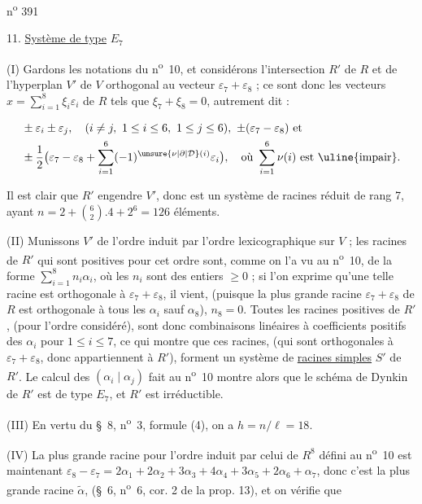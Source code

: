 \hfill n\textsuperscript{o} 391

11. \uline{Système de type} $E_7$

(I) Gardons les notations du n\textsuperscript{o}~10, et considérons l'intersection $R'$ de $R$ et de l'hyperplan $V'$ de $V$ orthogonal au vecteur $\varepsilon_7+\varepsilon_8$ ; ce sont donc les vecteurs $x=\displaystyle\sum_{i=1}^{8}\xi_i\varepsilon_i$ de $R$ tels que $\xi_7+\xi_8=0$, autrement dit :

\[
\begin{aligned}
&\pm\varepsilon_i\pm\varepsilon_j,\quad(i\neq j,\ 1\leq i\leq6,\ 1\leq j\leq6),\ \pm(\varepsilon_7-\varepsilon_8)\text{ et}\\
&\pm\frac{1}{2}\bigl(\varepsilon_7-\varepsilon_8+\sum_{i=1}^{6}(-1)^{\unsure{\nu|\partial|\mathcal D}(i)}\varepsilon_i\bigr),\quad\text{où }\sum_{i=1}^{6}\nu(i)\text{ est \uline{impair}.}
\end{aligned}
\]

Il est clair que $R'$ engendre $V'$, donc est un système de racines réduit de rang 7, ayant $n=2+\binom{6}{2}.4+2^6=126$ éléments.

(II) Munissons $V'$ de l'ordre induit par l'ordre lexicographique sur $V$ ; les racines de $R'$ qui sont positives pour cet ordre sont, comme on l'a vu au n\textsuperscript{o}~10, de la forme $\displaystyle\sum_{i=1}^{8}n_i\alpha_i$, où les $n_i$ sont des entiers $\geq0$ ; si l'on exprime qu'une telle racine est orthogonale à $\varepsilon_7+\varepsilon_8$, il vient, (puisque la plus grande racine $\varepsilon_7+\varepsilon_8$ de $R$ est orthogonale à tous les $\alpha_i$ sauf $\alpha_8$), $n_8=0$. Toutes les racines positives de $R'$, (pour l'ordre considéré), sont donc combinaisons linéaires à coefficients positifs des $\alpha_i$ pour $1\leq i\leq7$, ce qui montre que ces racines, (qui sont orthogonales à $\varepsilon_7+\varepsilon_8$, donc appartiennent à $R'$), forment un système de \uline{racines simples} $S'$ de $R'$. Le calcul des $(\alpha_i\mid\alpha_j)$ fait au n\textsuperscript{o}~10 montre alors que le schéma de Dynkin de $R'$ est de type $E_7$, et $R'$ est irréductible.

(III) En vertu du \S~8, n\textsuperscript{o}~3, formule (4), on a $h=n/\ell=18$.

(IV) La plus grande racine pour l'ordre induit par celui de $R^8$ défini au n\textsuperscript{o}~10 est maintenant $\varepsilon_8-\varepsilon_7=2\alpha_1+2\alpha_2+3\alpha_3+4\alpha_4+3\alpha_5+2\alpha_6+\alpha_7$, donc c'est la plus grande racine $\tilde\alpha$, (\S~6, n\textsuperscript{o}~6, cor. 2 de la prop. 13), et on vérifie que

